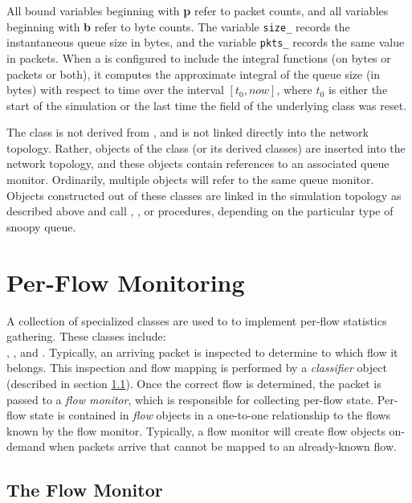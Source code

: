All bound variables beginning with {\bf p} refer to packet counts, and
all variables beginning with {\bf b} refer to byte counts.
The variable {\tt size\_} records the instantaneous queue size in bytes,
and the variable {\tt pkts\_} records the same value in packets.
When a  is configured to include the integral
functions (on bytes or packets or both), it
computes the approximate integral of the
queue size (in bytes)
with respect to time over the interval $[t_0, now]$, where
$t_0$ is either the start of the simulation or the last time the
 field of the underlying  class was reset.

The  class is not derived from , and
is not linked directly into the network topology.
Rather, objects of the  class (or its derived classes)
are inserted into the network topology, and these objects contain references
to an associated queue monitor.
Ordinarily, multiple  objects will refer to the same
queue monitor.
Objects constructed out of these classes are linked in the simulation
topology as described above and call 
, , or  procedures,
depending on the particular type of snoopy queue.

\section{Per-Flow Monitoring}
\label{sec:flowmon}

A collection of specialized classes are used to to implement
per-flow statistics gathering.
These classes include: \\
,
, and .
Typically, an arriving packet is inspected to determine
to which flow it belongs.
This inspection and flow mapping is performed by a {\em classifier}
object (described in section \ref{sec:flowmonitor}).
Once the correct flow is determined, the packet is passed to
a {\em flow monitor}, which is responsible for collecting per-flow
state.
Per-flow state is contained in {\em flow} objects in a one-to-one
relationship to the flows known by the flow monitor.
Typically, a flow monitor will create flow objects on-demand when
packets arrive that cannot be mapped to an already-known flow.

\subsection{The Flow Monitor}
\label{sec:flowmonitor}

